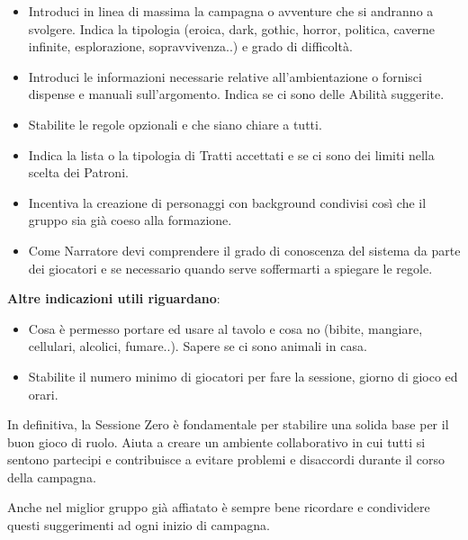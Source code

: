 \begin{multicols}{2}
\begin{itemize}[leftmargin=*] \setlength{\itemsep}{0pt}
\item Introduci in linea di massima la campagna o avventure che si andranno a svolgere. Indica la tipologia (eroica, dark, gothic, horror, politica, caverne infinite, esplorazione, sopravvivenza..) e grado di difficoltà.
\item Introduci le informazioni necessarie relative all'ambientazione o fornisci dispense e manuali sull'argomento. Indica se ci sono delle Abilità suggerite.
\item Stabilite le regole opzionali e che siano chiare a tutti.
\item Indica la lista o la tipologia di Tratti accettati e se ci sono dei limiti nella scelta dei Patroni.
\item Incentiva la creazione di personaggi con background condivisi così che il gruppo sia già coeso alla formazione.
\item Come Narratore devi comprendere il grado di conoscenza del sistema da parte dei giocatori e se necessario quando serve soffermarti a spiegare le regole.
\end{itemize}

\textbf{Altre indicazioni utili riguardano}:

\medskip

\begin{itemize}[leftmargin=*] \setlength{\itemsep}{0pt}
\item Cosa è permesso portare ed usare al tavolo e cosa no (bibite, mangiare, cellulari, alcolici, fumare..). Sapere se ci sono animali in casa.
\item Stabilite il numero minimo di giocatori per fare la sessione, giorno di gioco ed orari.
\end{itemize}

In definitiva, la Sessione Zero è fondamentale per stabilire una solida base per il buon gioco di ruolo. Aiuta a creare un ambiente collaborativo in cui tutti si sentono partecipi e contribuisce a evitare problemi e disaccordi durante il corso della campagna.

Anche nel miglior gruppo già affiatato è sempre bene ricordare e condividere questi suggerimenti ad ogni inizio di campagna.

\end{multicols}



